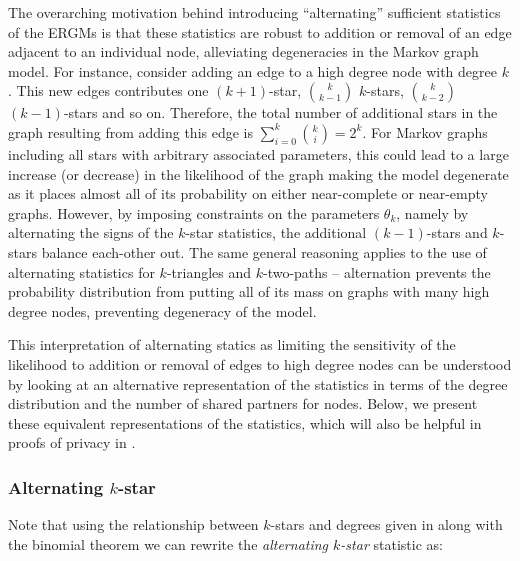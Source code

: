 The overarching motivation behind introducing ``alternating'' sufficient statistics of the ERGMs is that these statistics are robust to addition or removal of an edge adjacent to an individual node, alleviating degeneracies  in the Markov graph model. For instance, consider adding an edge to a high degree node with degree $k$. This new edges contributes one $(k+1)$-star, $\binom{k}{k-1}$ $k$-stars, $\binom{k}{k-2}$ $(k-1)$-stars and so on. Therefore, the total number of additional stars in the graph resulting from adding this edge is $\sum_{i = 0}^{k} \binom{k}{i} = 2^k$. For Markov graphs including all stars with arbitrary associated parameters, this could lead to a large increase (or decrease) in the likelihood of the graph making the model degenerate as it places almost all of its probability on either near-complete or near-empty graphs. However, by imposing constraints on the parameters $\theta_k$, namely by alternating the signs of  the $k$-star statistics, the additional $(k-1)$-stars and $k$-stars balance each-other out.   The same general reasoning applies to the use of alternating statistics for $k$-triangles and $k$-two-paths -- alternation prevents the probability distribution from putting all of its mass on graphs with many high degree nodes,  preventing degeneracy of the model. %
 
 This interpretation of alternating statics as limiting the sensitivity of the likelihood to addition or removal of edges to high degree nodes can be understood by looking at an alternative representation of the statistics in terms of the degree distribution and the number of shared partners for nodes. Below, we present these equivalent representations of the statistics, which will also be helpful in proofs of privacy in . 
 
 \subsubsection{Alternating $k$-star}
 
 Note that using the relationship between $k$-stars and degrees given in  along with the binomial theorem we can rewrite the \emph{alternating $k$-star} statistic as:
 
